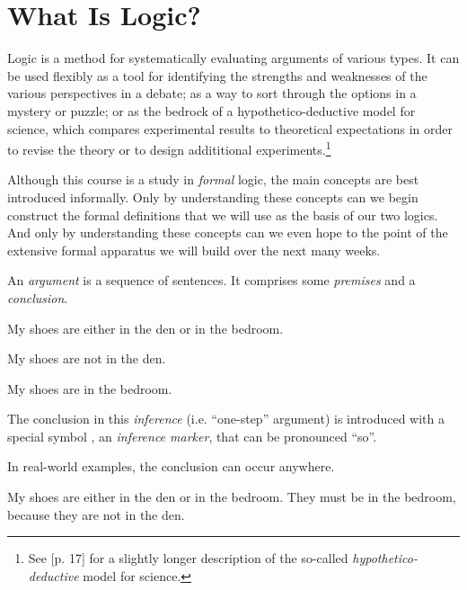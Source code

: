 \section{What Is Logic?}

Logic is a method for systematically evaluating arguments of various
types. It can be used flexibly as a tool for identifying the strengths
and weaknesses of the various perspectives in a debate; as a way to sort through
the options in a mystery or puzzle; or as the bedrock of a hypothetico-deductive
model for science, which compares experimental results to theoretical
expectations in order to revise the theory or to design addititional
experiments.\footnote{See \cite{Smi20}[p. 17] for a slightly longer description
of the so-called \emph{hypothetico-deductive} model for science.}

Although this course is a study in \emph{formal} logic, the main concepts are
best introduced informally. Only by understanding these concepts can we begin
construct the formal definitions that we will use as the basis of our two
logics. And only by understanding these concepts can we even hope to the point
of the extensive formal apparatus we will build over the next many weeks.


An \emph{argument} is a sequence of sentences. It comprises some \emph{premises}
and a \emph{conclusion}.

\begin{argument}
\item[] My shoes are either in the den or in the bedroom.
\item[] My shoes are not in the den.
\item[\therefore] My shoes are in the bedroom.
\end{argument}

The conclusion in this \emph{inference} (i.e. ``one-step'' argument) is
introduced with a special symbol \therefore, an \emph{inference marker},
that can be pronounced ``so''.

In real-world examples, the conclusion can occur anywhere.

\begin{argument}
\item[] My shoes are either in the den or in the bedroom. They must be in
  the bedroom, because they are not in the den.
\end{argument}

